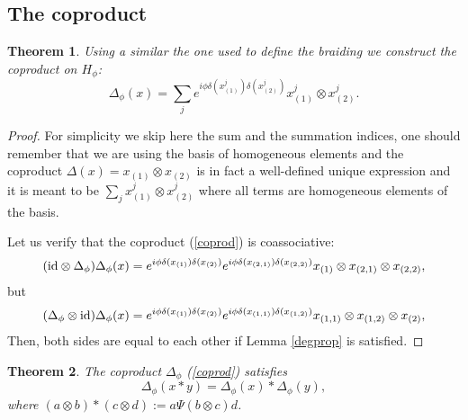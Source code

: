 \documentclass[12pt]{amsart}
\newtheorem{thm}{Theorem}[section]
\theoremstyle{definition}
\numberwithin{equation}{section}
\newcommand{\cop}{\Delta}           %
\newcommand{\ox}{\otimes}           %
\begin{document}
\subsection{The coproduct}
\begin{thm} 
\label{coass}
Using a similar the one used to define the braiding we construct the coproduct on $H_\phi$:
\begin{equation}
\Delta_\phi(x) = \sum_j e^{ i \phi \delta(x_{(1)}^j)  \delta(x_{(2)}^j)}  x_{(1)}^j \otimes  x_{(2)}^j.
\label{coprod}
\end{equation}
\end{thm}
\begin{proof}
For simplicity we skip here the sum and the summation indices, one should remember that
we are using the basis of homogeneous elements and the coproduct $\Delta(x) = 	x_{(1)} \otimes  x_{(2)}$
is in fact a well-defined unique expression and it is meant to be $\sum_j x_{(1)}^j \otimes  x_{(2)}^j$ where
all terms are homogeneous elements of the basis.

Let us verify that the coproduct (\ref{coprod}) is coassociative:
$$ (\hbox{id} \otimes \Delta_\phi) \Delta_\phi(x) = e^{ i \phi \delta(x_{(1)})  \delta(x_{(2)})}  
 e^{ i \phi \delta(x_{(2,1)})  \delta(x_{(2,2)})}
x_{(1)} \otimes  x_{(2,1)} \otimes x_{(2,2)}, $$
but 
$$ (\Delta_\phi  \otimes \hbox{id}) \Delta_\phi(x) = e^{ i \phi \delta(x_{(1)})  \delta(x_{(2)})}  
 e^{ i \phi \delta(x_{(1,1)})  \delta(x_{(1,2)})}
x_{(1,1)} \otimes  x_{(1,2)} \otimes x_{(2)}, $$
Then, both sides are equal to each other if Lemma \ref{degprop} is satisfied.
\end{proof}
\begin{thm}
\label{morph}
The coproduct $\Delta_\phi$ (\ref{coprod}) satisfies
$$\cop_{\phi}(x \ast y)=\cop_{\phi}(x)\ast\cop_{\phi}(y),$$
where $(a\ox b)\ast (c \ox d):=a \Psi(b \ox c) d$.
\end{thm}
\end{document}
